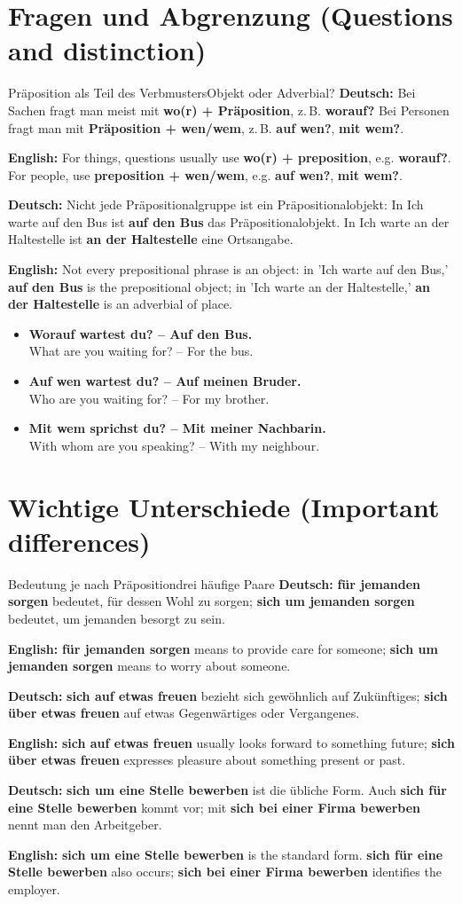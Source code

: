 \documentclass[a4paper,11pt]{article}
\newcommand{\GermanText}[1]{\textbf{Deutsch: }#1\par}
\newcommand{\EnglishText}[1]{{\small\color{SoftGray}\textbf{English: }#1\par}}
\newcommand{\ExampleItem}[2]{\item \textbf{#1}\\{\small\color{SoftGray}#2}}
\begin{document}
\section{Fragen und Abgrenzung (Questions and distinction)}
\begin{grammarentry}{Präposition als Teil des Verbmusters}{Objekt oder Adverbial?}
\GermanText{Bei Sachen fragt man meist mit \textbf{wo(r) + Präposition}, z.\,B. \textbf{worauf?} Bei Personen fragt man mit \textbf{Präposition + wen/wem}, z.\,B. \textbf{auf wen?}, \textbf{mit wem?}.}
\EnglishText{For things, questions usually use \textbf{wo(r) + preposition}, e.g. \textbf{worauf?}. For people, use \textbf{preposition + wen/wem}, e.g. \textbf{auf wen?}, \textbf{mit wem?}.}
\GermanText{Nicht jede Präpositionalgruppe ist ein Präpositionalobjekt: In \glqq Ich warte auf den Bus\grqq{} ist \textbf{auf den Bus} das Präpositionalobjekt. In \glqq Ich warte an der Haltestelle\grqq{} ist \textbf{an der Haltestelle} eine Ortsangabe.}
\EnglishText{Not every prepositional phrase is an object: in 'Ich warte auf den Bus,' \textbf{auf den Bus} is the prepositional object; in 'Ich warte an der Haltestelle,' \textbf{an der Haltestelle} is an adverbial of place.}
\end{grammarentry}
\begin{exbox}
\begin{itemize}
\ExampleItem{Worauf wartest du? -- Auf den Bus.}{What are you waiting for? -- For the bus.}
\ExampleItem{Auf wen wartest du? -- Auf meinen Bruder.}{Who are you waiting for? -- For my brother.}
\ExampleItem{Mit wem sprichst du? -- Mit meiner Nachbarin.}{With whom are you speaking? -- With my neighbour.}
\end{itemize}
\end{exbox}
\section{Wichtige Unterschiede (Important differences)}
\begin{grammarentry}{Bedeutung je nach Präposition}{drei häufige Paare}
\GermanText{\textbf{für jemanden sorgen} bedeutet, für dessen Wohl zu sorgen; \textbf{sich um jemanden sorgen} bedeutet, um jemanden besorgt zu sein.}
\EnglishText{\textbf{für jemanden sorgen} means to provide care for someone; \textbf{sich um jemanden sorgen} means to worry about someone.}
\GermanText{\textbf{sich auf etwas freuen} bezieht sich gewöhnlich auf Zukünftiges; \textbf{sich über etwas freuen} auf etwas Gegenwärtiges oder Vergangenes.}
\EnglishText{\textbf{sich auf etwas freuen} usually looks forward to something future; \textbf{sich über etwas freuen} expresses pleasure about something present or past.}
\GermanText{\textbf{sich um eine Stelle bewerben} ist die übliche Form. Auch \textbf{sich für eine Stelle bewerben} kommt vor; mit \textbf{sich bei einer Firma bewerben} nennt man den Arbeitgeber.}
\EnglishText{\textbf{sich um eine Stelle bewerben} is the standard form. \textbf{sich für eine Stelle bewerben} also occurs; \textbf{sich bei einer Firma bewerben} identifies the employer.}
\end{grammarentry}
\end{document}
